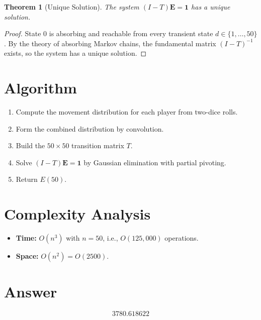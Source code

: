 \documentclass[12pt]{article}
\newtheorem{theorem}{Theorem}
\begin{document}
\begin{theorem}[Unique Solution]
The system $(I - T)\mathbf{E} = \mathbf{1}$ has a unique solution.
\end{theorem}
\begin{proof}
State 0 is absorbing and reachable from every transient state $d \in \{1, \ldots, 50\}$. By the theory of absorbing Markov chains, the fundamental matrix $(I - T)^{-1}$ exists, so the system has a unique solution.
\end{proof}

\section{Algorithm}
\begin{enumerate}
\item Compute the movement distribution for each player from two-dice rolls.
\item Form the combined distribution by convolution.
\item Build the $50 \times 50$ transition matrix $T$.
\item Solve $(I - T)\mathbf{E} = \mathbf{1}$ by Gaussian elimination with partial pivoting.
\item Return $E(50)$.
\end{enumerate}

\section{Complexity Analysis}
\begin{itemize}
\item \textbf{Time:} $O(n^3)$ with $n = 50$, i.e., $O(125{,}000)$ operations.
\item \textbf{Space:} $O(n^2) = O(2500)$.
\end{itemize}

\section{Answer}

\[
\boxed{3780.618622}
\]
\end{document}
